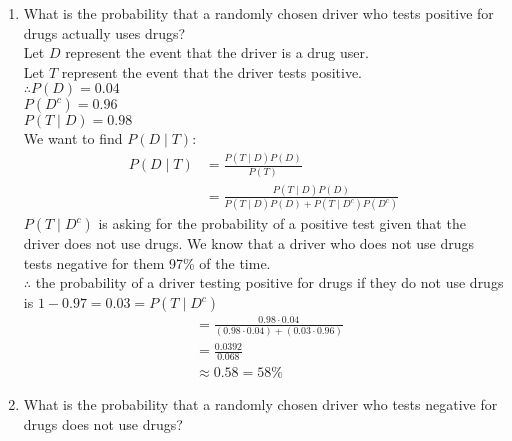 \documentclass{article}
\begin{document}
\begin{enumerate}
\begin{enumerate}
\item  What is the probability that  a randomly chosen driver who tests positive for drugs actually uses drugs?\\

Let $D$ represent the event that the driver is a drug user.\\
Let $T$ represent the event that the driver tests positive.\\
$\therefore P(D) = 0.04$ \\
$P(D^c) = 0.96$\\
$P(T \mid D) = 0.98$\\
We want to find $P(D \mid T)$:\\
\begin {align}
P(D \mid T) &= \frac{P(T \mid D)P(D)}{P(T)}\\
&= \frac{P(T\mid D)P(D)}{P(T\mid D)P(D) + P(T \mid D^c)P(D^c)}
\end {align}
$P(T \mid D^c)$ is asking for the probability of a positive test given that the driver does not use drugs. We know that a driver who does not use drugs tests negative for them 97\% of the time.\\
$\therefore$ the probability of a driver testing positive for drugs if they do not use drugs is $1 - 0.97 = 0.03 = P(T \mid D^c)$\\
\begin {align}
&= \frac{0.98 \cdot 0.04}{(0.98 \cdot 0.04) + (0.03 \cdot 0.96)}\\
&= \frac{0.0392}{0.068}\\
&\approx 0.58 = 58\%
\end {align}

\item What is the probability that a randomly chosen driver who tests negative for drugs does not use drugs? \\


\end{enumerate}
\end{enumerate}
\end{document}
